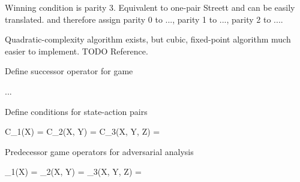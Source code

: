 Winning condition is parity 3.
Equivalent to one-pair Streett and can be easily translated.
 and therefore assign parity 0 to ..., parity 1 to ..., parity 2 to ....

Quadratic-complexity algorithm exists, but cubic, fixed-point algorithm much easier to implement.
TODO Reference.


Define successor operator for game

\startformula
    ...
\stopformula

Define conditions for state-action pairs

\startformula
    \startalign[n=2,align={right,left}]
        \NC C_1(X) =
        \NC {}
        \NR
        \NC C_2(X, Y) =
        \NC {}
        \NR
        \NC C_3(X, Y, Z) =
        \NC {}
        \NR
    \stopalign
\stopformula


Predecessor game operators for adversarial analysis

\startformula
    \startalign[n=2,align={right,left}]
        \NC \Pre_1(X) =
        \NC {} \cup {}
        \NR
        \NC \Pre_2(X, Y) =
        \NC {} \cup {}
        \NR
        \NC \Pre_3(X, Y, Z) =
        \NC {} \cup {}
        \NR
    \stopalign
\stopformula

